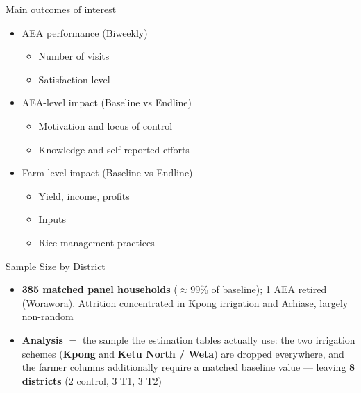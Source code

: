 \documentclass[aspectratio=169]{beamer}
\newcommand{\notefont}{\fontsize{5pt}{6pt}\selectfont}
\begin{document}
\begin{frame}{Main outcomes of interest}
	\begin{itemize}
		\item AEA performance (Biweekly) 
		\begin{itemize}
			\item Number of visits
			\item Satisfaction level 
		\end{itemize}

		\item AEA-level impact (Baseline vs Endline)
		\begin{itemize}
			\item Motivation and locus of control 
			\item Knowledge and self-reported efforts 
		\end{itemize}


		\item Farm-level impact  (Baseline vs Endline)
        \begin{itemize}
			\item Yield, income, profits
			\item Inputs
			\item Rice management practices
			\vspace{0.3cm}
		\end{itemize}		
	\end{itemize}
\end{frame}

\begin{frame}{Sample Size by District}
\begin{table}[hbtp]
	\centering
	\begin{threeparttable}
	\end{threeparttable}
\end{table}
\vspace{-4pt}
\begin{itemize}\notefont
	\item \textbf{385 matched panel households} ($\approx$99\% of baseline); 1 AEA retired (Worawora).
	      Attrition concentrated in Kpong irrigation and Achiase, largely non-random
	\item \textbf{Analysis} $=$ the sample the estimation tables actually use: the two irrigation
	      schemes (\textbf{Kpong} and \textbf{Ketu North / Weta}) are dropped everywhere, and the
	      farmer columns additionally require a matched baseline value --- leaving
	      \textbf{8 districts} (2 control, 3 T1, 3 T2)
\end{itemize}
\end{frame}
\end{document}
